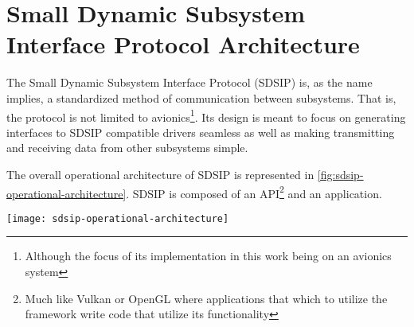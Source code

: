 \section{Small Dynamic Subsystem Interface Protocol Architecture}
\label{sec:sdsip}

The Small Dynamic Subsystem Interface Protocol (SDSIP) is, as the name implies, a standardized method of communication
between subsystems. That is, the protocol is not limited to avionics\footnote{Although the focus of its implementation
in this work being on an avionics system}. Its design is meant to focus on generating interfaces to SDSIP compatible
drivers seamless as well as making transmitting and receiving data from other subsystems simple.

The overall operational architecture of SDSIP is represented in \autoref{fig:sdsip-operational-architecture}. SDSIP is
composed of an API\footnote{Much like Vulkan or OpenGL where applications that which to utilize the framework write code
that utilize its functionality} and an application.

\begin{figure*}[ht]
  \begin{center}
    \texttt{[image: sdsip-operational-architecture]}
  \end{center}
  \caption{}
  \label{fig:sdsip-operational-architecture}
\end{figure*}
